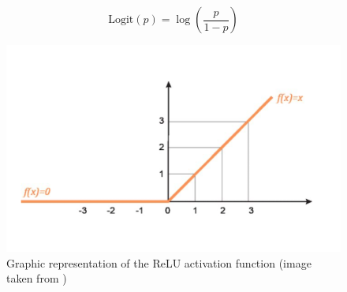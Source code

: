 \documentclass[conference]{IEEEtran}
\begin{document}
\begin{equation}
    \text{Logit}(p) = \log \left( \frac{p}{1 - p} \right)
    \label{logit}
\end{equation}

\begin{figure}
    \centering
    \includegraphics[width=\linewidth]{img/relu.png}
    \caption{Graphic representation of the ReLU activation function (image taken from \cite{relumax})}
    \label{fig:relu}
\end{figure}
\end{document}

